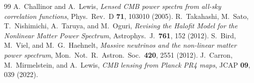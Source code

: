 \documentclass[11pt,a4paper]{article}
\begin{document}
\begin{thebibliography}{99}
 A.~Challinor and A.~Lewis, \textit{Lensed CMB power spectra from all-sky correlation functions}, Phys.\ Rev.\ D \textbf{71}, 103010 (2005).
 R.~Takahashi, M.~Sato, T.~Nishimichi, A.~Taruya, and M.~Oguri, \textit{Revising the Halofit Model for the Nonlinear Matter Power Spectrum}, Astrophys.\ J.\ \textbf{761}, 152 (2012).
 S.~Bird, M.~Viel, and M.~G.~Haehnelt, \textit{Massive neutrinos and the non-linear matter power spectrum}, Mon.\ Not.\ R.\ Astron.\ Soc.\ \textbf{420}, 2551 (2012).
 J.~Carron, M.~Mirmelstein, and A.~Lewis, \textit{CMB lensing from Planck PR4 maps}, JCAP \textbf{09}, 039 (2022).
\end{thebibliography}
\end{document}
